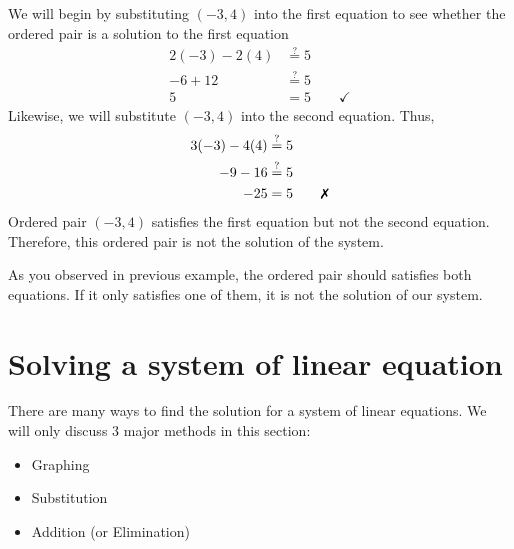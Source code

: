 %
We will begin by substituting $(-3, 4)$ into the first equation to see whether the  ordered pair is a solution to the first equation	
		\begin{align*}
			2(-3)-2(4) &\stackrel{?}{=} 5 \\
			-6 +12 &\stackrel{?}{=}	5 \\
			5 &=5 \qquad \checkmark
		\end{align*}
Likewise, we will substitute $(-3, 4)$ into the second equation. Thus,
		\begin{align*}
			3(-3)-4(4) &\stackrel{?}{=} 5 \\
			-9 -16 &\stackrel{?}{=}	5 \\
			-25 &=5 \qquad \xmark
		\end{align*}
Ordered pair $(-3, 4)$ satisfies the first equation but not the second equation. Therefore, this ordered pair is not the solution of the system. 
\begin{note}
    As you observed in previous example, the ordered pair should satisfies both equations. If it only satisfies one of them, it is not the solution of our system.
\end{note}
\section{Solving a system of linear equation}
There are many ways to find the solution for a system of linear equations. We will only discuss 3 major methods in this section:
\begin{itemize}
	\item Graphing
	\item Substitution
	\item Addition (or Elimination)
\end{itemize}
